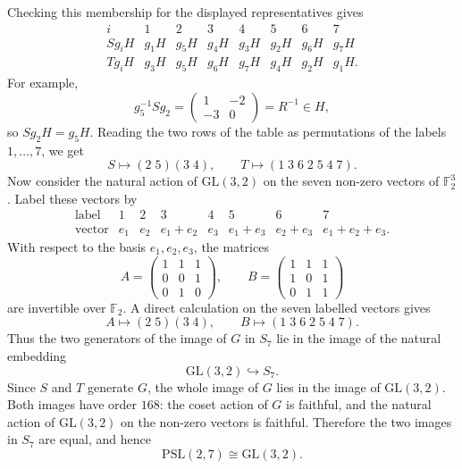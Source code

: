 \documentclass[../Odyssey_Project.tex]{subfiles}
\begin{document}
\begin{solution}
\[\]
Checking this membership for the displayed representatives gives
\[
\begin{array}{c|ccccccc}
    i & 1&2&3&4&5&6&7\\
    \hline
    Sg_iH & g_1H&g_5H&g_4H&g_3H&g_2H&g_6H&g_7H\\
    Tg_iH & g_3H&g_5H&g_6H&g_7H&g_4H&g_2H&g_1H.
\end{array}
\]
For example,
\[
    g_5^{-1}Sg_2=
    \begin{pmatrix}
        1  & -2\\
        -3 & 0
    \end{pmatrix}
    =R^{-1}\in H,
\]
so $Sg_2H=g_5H$. Reading the two rows of the table as permutations of the labels $1,\ldots,7$, we get
\[
    S\mapsto (2\;5)(3\;4),
    \qquad
    T\mapsto (1\;3\;6\;2\;5\;4\;7).
\]
Now consider the natural action of $\mathrm{GL}(3,2)$ on the seven non-zero vectors of $\mathbb F_2^3$. Label these vectors by
\[
\begin{array}{c|ccccccc}
    \text{label} & 1&2&3&4&5&6&7\\
    \hline
    \text{vector} & e_1&e_2&e_1+e_2&e_3&e_1+e_3&e_2+e_3&e_1+e_2+e_3.
\end{array}
\]
With respect to the basis $e_1,e_2,e_3$, the matrices
\[
    A=
    \begin{pmatrix}
        1&1&1\\
        0&0&1\\
        0&1&0
    \end{pmatrix},
    \qquad
    B=
    \begin{pmatrix}
        1&1&1\\
        1&0&1\\
        0&1&1
    \end{pmatrix}
\]
are invertible over $\mathbb F_2$. A direct calculation on the seven labelled vectors gives
\[
    A\mapsto (2\;5)(3\;4),
    \qquad
    B\mapsto (1\;3\;6\;2\;5\;4\;7).
\]
Thus the two generators of the image of $G$ in $S_7$ lie in the image of the natural embedding
\[
    \mathrm{GL}(3,2)\hookrightarrow S_7.
\]
Since $S$ and $T$ generate $G$, the whole image of $G$ lies in the image of $\mathrm{GL}(3,2)$. Both images have order $168$: the coset action of $G$ is faithful, and the natural action of $\mathrm{GL}(3,2)$ on the non-zero vectors is faithful. Therefore the two images in $S_7$ are equal, and hence
\[
    \mathrm{PSL}(2,7)\cong \mathrm{GL}(3,2).
\]
\end{solution}
\end{document}
